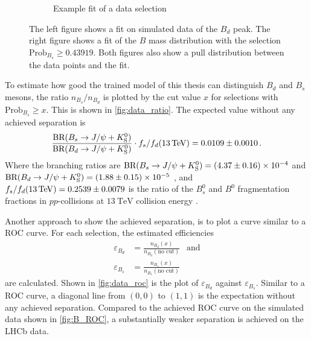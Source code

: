 \begin{figure}
\begin{subfigure}{0.5\textwidth}
        \caption{Example fit of a data selection}
        \label{fig:fit_example}
    \end{subfigure}%
    \caption{The left figure shows a fit on simulated data of the $B_d$ peak. The right figure shows a fit of the $B$ mass distribution with the selection $\text{Prob}_{B_s} \geq 0.43919$. Both figures also show a pull distribution between the data points and the fit.}
\end{figure}

To estimate how good the trained model of this thesis can distinguish $B_d$ and $B_s$ mesons, the ratio $n_{B_s}/n_{B_d}$ is plotted by the cut value $x$ for selections with $\text{Prob}_{B_s} \geq x$. 
This is shown in \autoref{fig:data_ratio}.
The expected value without any achieved separation is 
\begin{equation*}
    \frac{\text{BR}(B_s \rightarrow J/\psi + K^0_\text{S})}{\text{BR}(B_d \rightarrow J/\psi + K^0_\text{S})} \cdot 
    f_s/f_d(\qty{13}{\TeV}) = \num{0.0109\pm0.0010} \, .
\end{equation*}
Where the branching ratios are $\text{BR}(B_s \rightarrow J/\psi + K^0_\text{S}) = \num{4.37\pm0.16e-4}$ and $\text{BR}(B_d \rightarrow J/\psi + K^0_\text{S}) = \num{1.88\pm0.15e-5}$ \cite{pdg}, and $f_s/f_d(\qty{13}{\TeV}) = \num{0.2539\pm0.0079}$ is the ratio of the $B^0_s$ and $B^0$ fragmentation fractions in $pp$-collisions at $\qty{13}{\TeV}$ collision energy \cite{fsfd}.

Another approach to show the achieved separation, is to plot a curve similar to a ROC curve. 
For each selection, the estimated efficiencies
\begin{align*}
    \varepsilon_{B_d} &= \frac{n_{B_d}(x)}{n_{B_d}(\text{no cut})} \: \: \text{ and} \\
    \varepsilon_{B_s} &= \frac{n_{B_s}(x)}{n_{B_s}(\text{no cut})}
\end{align*}
are calculated. Shown in \autoref{fig:data_roc} is the plot of $\varepsilon_{B_d}$ against $\varepsilon_{B_s}$.
Similar to a ROC curve, a diagonal line from $(0,0)$ to $(1,1)$ is the expectation without any achieved separation.
Compared to the achieved ROC curve on the simulated data shown in \autoref{fig:B_ROC}, a substantially weaker separation is achieved on the LHCb data.

